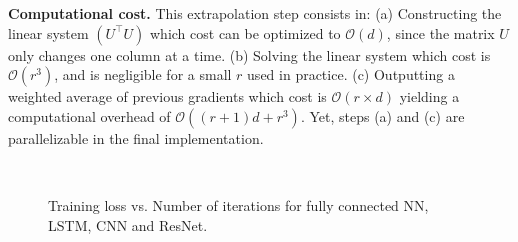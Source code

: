 \documentclass[11pt]{article}
\theoremstyle{k}
\begin{document}
\textbf{Computational cost.} This extrapolation step consists in: \textsf{(a)} Constructing the linear system $(U^\top U)$ which cost can be optimized to $\mathcal{O}(d)$, since the matrix $U$ only changes one column at a time. \textsf{(b)} Solving the linear system which cost is $\mathcal{O}(r^3)$, and is negligible for a small $r$ used in practice.\textsf{ (c)} Outputting a weighted average of previous gradients which cost is $\mathcal{O}(r \times d)$ yielding a computational overhead of $\mathcal O\left((r+1)d+r^3\right)$.
Yet, steps (a) and (c) are parallelizable in the final implementation.

\begin{figure}[t]
\mbox{
}
\caption{Training loss vs. Number of iterations for fully connected NN, LSTM, CNN and ResNet.}
\label{fig:train_loss}
\end{figure}
\end{document}
